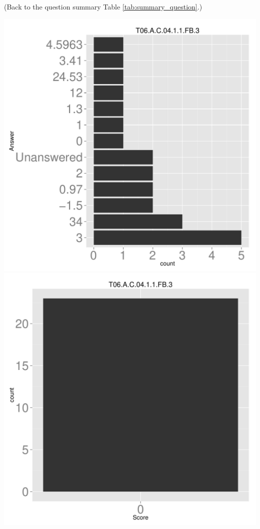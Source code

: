\documentclass[12pt,nohyper]{tufte-handout}\usepackage[]{graphicx}\usepackage[]{color}
\begin{document}
 (Back to the question summary Table \ref{tab:summary_question}.)

\begin{center} \includegraphics[width=.45\linewidth]{Topic06_11_answer} \includegraphics[width=.45\linewidth]{Topic06_11_score} \end{center} 
\end{document}
